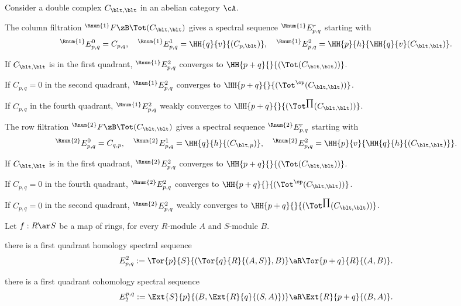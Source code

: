 \documentclass[a4paper, twoside]{article}
\begin{document}
\begin{thm}[5.6.1, 5.6.2]
    Consider a double complex $C_{\blt,\blt}$ in an abelian category $\cA$.

    The column filtration ${}^{\Rnum{1}}F\zB\Tot(C_{\blt,\blt})$ gives a spectral sequence ${}^{\Rnum{1}}E_{p,q}^{r}$ starting with
    \[
        {}^{\Rnum{1}}E_{p,q}^{0}=C_{p,q},\quad {}^{\Rnum{1}}E_{p,q}^{1}=\HH{q}{v}{(C_{p,\blt})},\quad {}^{\Rnum{1}}E_{p,q}^{2}=\HH{p}{h}{\HH{q}{v}(C_{\blt,\blt})}.
    \]

    \begin{itm}
        \item If $C_{\blt,\blt}$ is in the first quadrant, ${}^{\Rnum{1}}E_{p,q}^{2}$ converges to $\HH{p+q}{}{(\Tot(C_{\blt,\blt}))}$.
        \item If $C_{p,q}=0$ in the second quadrant, ${}^{\Rnum{1}}E_{p,q}^{2}$ converges to $\HH{p+q}{}{(\Tot^{\op}(C_{\blt,\blt}))}$.
        \item If $C_{p,q}$ in the fourth quadrant, ${}^{\Rnum{1}}E_{p,q}^{2}$ weakly converges to $\HH{p+q}{}{(\Tot^{\prod}(C_{\blt,\blt}))}$.
    \end{itm}

    The row filtration ${}^{\Rnum{2}}F\zB\Tot(C_{\blt,\blt})$ gives a spectral sequence ${}^{\Rnum{2}}E_{p,q}^{r}$ starting with
    \[
        {}^{\Rnum{2}}E_{p,q}^{0}=C_{q,p},\quad {}^{\Rnum{2}}E_{p,q}^{1}=\HH{q}{h}{(C_{\blt,p})},\quad {}^{\Rnum{2}}E_{p,q}^{2}=\HH{p}{v}{\HH{q}{h}{(C_{\blt,\blt})}}.
    \]

    \begin{itm}
        \item If $C_{\blt,\blt}$ is in the first quadrant, ${}^{\Rnum{2}}E_{p,q}^{2}$ converges to $\HH{p+q}{}{(\Tot(C_{\blt,\blt}))}$.
        \item If $C_{p,q}=0$ in the fourth quadrant, ${}^{\Rnum{2}}E_{p,q}^{2}$ converges to $\HH{p+q}{}{(\Tot^{\op}(C_{\blt,\blt}))}$.
        \item If $C_{p,q}=0$ in the second quadrant, ${}^{\Rnum{2}}E_{p,q}^{2}$ weakly converges to $\HH{p+q}{}{(\Tot^{\prod}(C_{\blt,\blt}))}$.
    \end{itm}
\end{thm}

\begin{thm}[5.6.6, 5.6.3]
    Let $f:R\ar S$ be a map of rings, for every $R$-module $A$ and $S$-module $B$.
    \begin{itm}
        \item there is a first quadrant homology spectral sequence
        \[
            E_{p,q}^{2}:=\Tor{p}{S}{(\Tor{q}{R}{(A,S)},B)}\aR\Tor{p+q}{R}{(A,B)}.
        \]
        \item there is a first quadrant cohomology spectral sequence
        \[
            E_{2}^{p,q}:=\Ext{S}{p}{(B,\Ext{R}{q}{(S,A)})}\aR\Ext{R}{p+q}{(B,A)}.
        \]
    \end{itm}
\end{thm}
\end{document}
